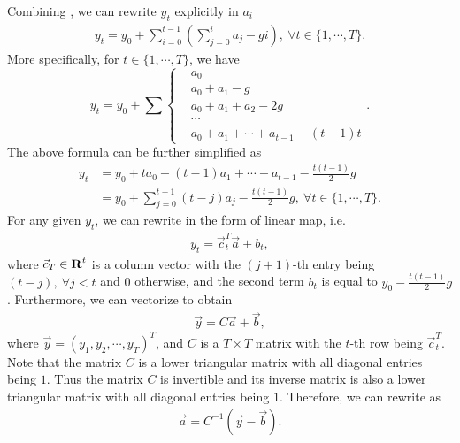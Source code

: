 \documentclass[letterpaper,11pt]{article}
\begin{document}
Combining , we can rewrite $y_t$ explicitly in $a_i$
\begin{align}
    \label{eq:yt-rewrite}
    y_t = y_0 + \sum_{i=0}^{t-1} \left(\sum_{j=0}^{i} a_j - g i\right),~\forall t\in \{1,\cdots,T\}.
\end{align}
More specifically, for $t\in \{1,\cdots,T\}$, we have
\begin{equation}
    y_t=y_0+\sum 
    \left\{
        \begin{array}{lllll}
            & a_0\\
            & a_0+a_1-g\\
            & a_0+a_1+a_2-2g\\
            & \cdots\\
            & a_0+a_1+\cdots+a_{t-1}-(t-1)t
        \end{array}
    \right..
\end{equation}
The above formula can be further simplified as
\begin{align}
    y_t &= y_0 + t a_0 + (t-1)a_1 + \cdots + a_{t-1} - \frac{t(t-1)}{2} g\\
    \label{eq:yt-rewrite2}
    &= y_0 + \sum_{j=0}^{t-1} (t-j) a_j - \frac{t(t-1)}{2} g,~\forall t\in \{1,\cdots,T\}.
\end{align}
For any given $y_t$, we can rewrite  in the form of linear map, i.e.
\begin{align}
    \label{eq:yt-liear-combine}
    y_t = \vec c_t^T \vec a + b_t,
\end{align}
where $\vec c_T\in \operatorname{\mathbf{R}}^t$ is a column vector with the $(j+1)$-th entry being $(t-j),~\forall j<t$ and $0$ otherwise, and the second term $b_t$ is equal to $y_0-\frac{t(t-1)}{2} g$.
Furthermore, we can vectorize  to obtain
\begin{align}
    \label{eq:yt-liear-map}
    \vec y = C \vec a + \vec b,
\end{align}
where $\vec y=(y_1,y_2,\cdots,y_T)^T$, and $C$ is a $T\times T$ matrix with the $t$-th row being $\vec c_t^T$.
Note that the matrix $C$ is a lower triangular matrix with all diagonal entries being $1$.
Thus the matrix $C$ is invertible and its inverse matrix is also a lower triangular matrix with all diagonal entries being $1$.
Therefore, we can rewrite  as
\begin{align}
    \label{eq:yt-liear-map2}
    \vec a = C^{-1} (\vec y - \vec b).
\end{align}
\end{document}
